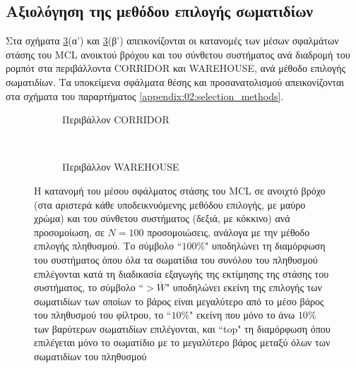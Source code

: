 \subsection{Αξιολόγηση της μεθόδου επιλογής σωματιδίων}

Στα σχήματα \ref{fig:02_02_04:selections}(α') και
\ref{fig:02_02_04:selections}(β') απεικονίζονται οι κατανομές των μέσων
σφαλμάτων στάσης του MCL ανοικτού βρόχου και του σύνθετου συστήματος ανά
διαδρομή του ρομπότ στα περιβάλλοντα CORRIDOR και WAREHOUSE, ανά μέθοδο
επιλογής σωματιδίων. Τα υποκείμενα σφάλματα θέσης και προσανατολισμού
απεικονίζονται στα σχήματα του παραρτήματος
\ref{appendix:02:selection_methods}.


\begin{figure}[h]
  \begin{subfigure}{\linewidth}
  \hspace{-1.25cm}
    
    \vspace{0.3cm}
    \caption{Περιβάλλον CORRIDOR}
    \label{fig:02_02_04:corridor_selections}
  \end{subfigure}\\
  \begin{subfigure}{\linewidth}\vspace{0.5cm}
    \hspace{-1.25cm}
    
    \vspace{0.3cm}
    \caption{Περιβάλλον WAREHOUSE}
    \label{fig:02_02_04:warehouse_selections}
  \end{subfigure}
\caption{\small Η κατανομή του μέσου σφάλματος στάσης του MCL σε ανοιχτό βρόχο
         (στα αριστερά κάθε υποδεικνυόμενης μεθόδου επιλογής, με μαύρο χρώμα)
         και του σύνθετου συστήματος (δεξιά, με κόκκινο) ανά προσομοίωση, σε
         $N=100$ προσομοιώσεις, ανάλογα με την μέθοδο επιλογής πληθυσμού. Το
         σύμβολο ``$100\%$" υποδηλώνει τη διαμόρφωση του συστήματος όπου όλα τα
         σωματίδια του συνόλου του πληθυσμού επιλέγονται κατά τη διαδικασία
         εξαγωγής της εκτίμησης της στάσης του συστήματος, το σύμβολο
         ``$>\overline{W}$" υποδηλώνει εκείνη της επιλογής των σωματιδίων των
         οποίων το βάρος είναι μεγαλύτερο από το μέσο βάρος του πληθυσμού του
         φίλτρου, το ``$10\%$" εκείνη που μόνο το άνω $10\%$ των βαρύτερων
         σωματιδίων επιλέγονται, και ``top" τη διαμόρφωση όπου επιλέγεται μόνο
         το σωματίδιο με το μεγαλύτερο βάρος μεταξύ όλων των σωματιδίων του
         πληθυσμού}
\label{fig:02_02_04:selections}
\end{figure}


